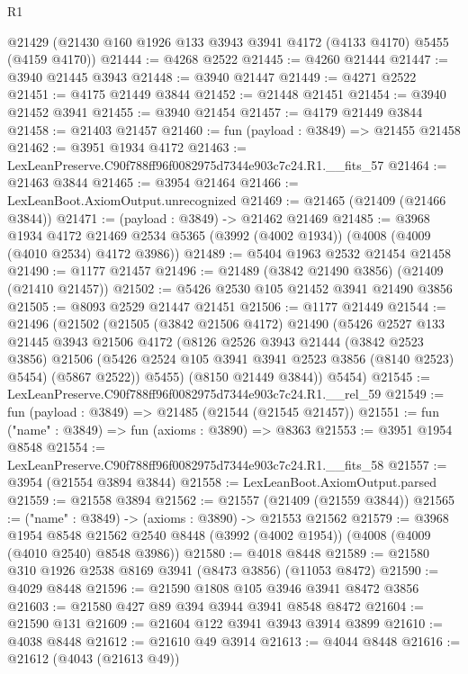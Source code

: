 \begin{lexlean}{R1}
\begin{coremodule}
  @21429 (@21430 @160 @1926 @133 @3943 @3941 @4172 (@4133 @4170) @5455 (@4159 @4170))
@21444 := @4268 @2522
@21445 := @4260 @21444
@21447 := @3940 @21445 @3943
@21448 := @3940 @21447
@21449 := @4271 @2522
@21451 := @4175 @21449 @3844
@21452 := @21448 @21451
@21454 := @3940 @21452 @3941
@21455 := @3940 @21454
@21457 := @4179 @21449 @3844
@21458 := @21403 @21457
@21460 := fun (payload : @3849) => @21455 @21458
@21462 := @3951 @1934 @4172
@21463 := LexLeanPreserve.C90f788ff96f0082975d7344e903c7c24.R1.__fits_57
@21464 := @21463 @3844
@21465 := @3954 @21464
@21466 := LexLeanBoot.AxiomOutput.unrecognized
@21469 := @21465 (@21409 (@21466 @3844))
@21471 := (payload : @3849) -> @21462 @21469
@21485 := @3968
    @1934
    @4172
    @21469
    @2534
    @5365
    (@3992 (@4002 @1934))
    (@4008 (@4009 (@4010 @2534) @4172 @3986))
@21489 := @5404 @1963 @2532 @21454 @21458
@21490 := @1177 @21457
@21496 := @21489 (@3842 @21490 @3856) (@21409 (@21410 @21457))
@21502 := @5426 @2530 @105 @21452 @3941 @21490 @3856
@21505 := @8093 @2529 @21447 @21451
@21506 := @1177 @21449
@21544 := @21496
    (@21502
      (@21505
        (@3842 @21506 @4172)
        @21490
        (@5426
          @2527
          @133
          @21445
          @3943
          @21506
          @4172
          (@8126
            @2526
            @3943
            @21444
            (@3842 @2523 @3856)
            @21506
            (@5426 @2524 @105 @3941 @3941 @2523 @3856 (@8140 @2523) @5454)
            (@5867 @2522))
          @5455)
        (@8150 @21449 @3844))
      @5454)
@21545 := LexLeanPreserve.C90f788ff96f0082975d7344e903c7c24.R1.__rel_59
@21549 := fun (payload : @3849) => @21485 (@21544 (@21545 @21457))
@21551 := fun ("name" : @3849) => fun (axioms : @3890) => @8363
@21553 := @3951 @1954 @8548
@21554 := LexLeanPreserve.C90f788ff96f0082975d7344e903c7c24.R1.__fits_58
@21557 := @3954 (@21554 @3894 @3844)
@21558 := LexLeanBoot.AxiomOutput.parsed
@21559 := @21558 @3894
@21562 := @21557 (@21409 (@21559 @3844))
@21565 := ("name" : @3849) -> (axioms : @3890) -> @21553 @21562
@21579 := @3968
    @1954
    @8548
    @21562
    @2540
    @8448
    (@3992 (@4002 @1954))
    (@4008 (@4009 (@4010 @2540) @8548 @3986))
@21580 := @4018 @8448
@21589 := @21580 @310 @1926 @2538 @8169 @3941 (@8473 @3856) (@11053 @8472)
@21590 := @4029 @8448
@21596 := @21590 @1808 @105 @3946 @3941 @8472 @3856
@21603 := @21580 @427 @89 @394 @3944 @3941 @8548 @8472
@21604 := @21590 @131
@21609 := @21604 @122 @3941 @3943 @3914 @3899
@21610 := @4038 @8448
@21612 := @21610 @49 @3914
@21613 := @4044 @8448
@21616 := @21612 (@4043 (@21613 @49))

\end{coremodule}
\end{lexlean}
